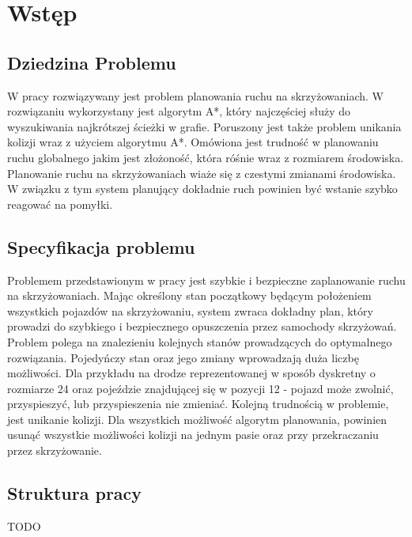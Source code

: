 \chapter{Wstęp}

\section{Dziedzina Problemu}

W pracy rozwiązywany jest problem planowania ruchu na skrzyżowaniach.
\newline
\newline
W rozwiązaniu wykorzystany jest algorytm A*, który najczęściej służy do wyszukiwania najkrótszej ścieżki w grafie.
\newline
\newline
Poruszony jest także problem unikania kolizji wraz z użyciem algorytmu A*.
\newline
\newline
Omówiona jest trudność w planowaniu ruchu globalnego jakim jest złożoność, która róśnie wraz z rozmiarem środowiska.
\newline
\newline
Planowanie ruchu na skrzyżowaniach wiaże się z czestymi zmianami środowiska. W związku z tym system planujący dokładnie ruch powinien być wstanie szybko reagować na pomyłki.

\section{Specyfikacja problemu}

Problemem przedstawionym w pracy jest szybkie i bezpieczne zaplanowanie ruchu na skrzyżowaniach. Mając określony stan początkowy będącym położeniem wszystkich pojazdów na skrzyżowaniu, system zwraca dokładny plan, który prowadzi do szybkiego i bezpiecznego opuszczenia przez samochody skrzyżowań.
\newline
\newline
Problem polega na znalezieniu kolejnych stanów prowadzących do optymalnego rozwiązania. Pojedyńczy stan oraz jego zmiany wprowadzają duża liczbę możliwości. Dla przykładu na drodze reprezentowanej w sposób dyskretny o rozmiarze 24 oraz pojeździe znajdującej się w pozycji 12 - pojazd może zwolnić, przyspieszyć, lub przyspieszenia nie zmieniać.
\newline
\newline
Kolejną trudnością w problemie, jest unikanie kolizji. Dla wszystkich możliwość algorytm planowania, powinien usunąć wszystkie możliwości kolizji na jednym pasie oraz przy przekraczaniu przez skrzyżowanie.

\section{Struktura pracy}
TODO
